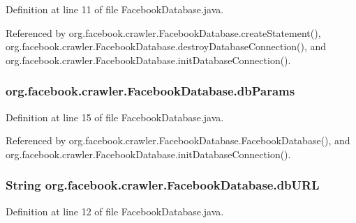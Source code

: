 Definition at line 11 of file Facebook\-Database.\-java.



Referenced by org.\-facebook.\-crawler.\-Facebook\-Database.\-create\-Statement(), org.\-facebook.\-crawler.\-Facebook\-Database.\-destroy\-Database\-Connection(), and org.\-facebook.\-crawler.\-Facebook\-Database.\-init\-Database\-Connection().

\hypertarget{classorg_1_1facebook_1_1crawler_1_1_facebook_database_a34e83032342cbc6e64111e127b123701}{
\subsubsection[{db\-Params}]{ org.\-facebook.\-crawler.\-Facebook\-Database.\-db\-Params\hspace{0.3cm}{\ttfamily [private]}}}\label{classorg_1_1facebook_1_1crawler_1_1_facebook_database_a34e83032342cbc6e64111e127b123701}


Definition at line 15 of file Facebook\-Database.\-java.



Referenced by org.\-facebook.\-crawler.\-Facebook\-Database.\-Facebook\-Database(), and org.\-facebook.\-crawler.\-Facebook\-Database.\-init\-Database\-Connection().

\hypertarget{classorg_1_1facebook_1_1crawler_1_1_facebook_database_ac086ee9bb59d45c5bf830f305000ede7}{
\subsubsection[{db\-U\-R\-L}]{\setlength{\rightskip}{0pt plus 5cm}String org.\-facebook.\-crawler.\-Facebook\-Database.\-db\-U\-R\-L\hspace{0.3cm}{\ttfamily [private]}}}\label{classorg_1_1facebook_1_1crawler_1_1_facebook_database_ac086ee9bb59d45c5bf830f305000ede7}


Definition at line 12 of file Facebook\-Database.\-java.



